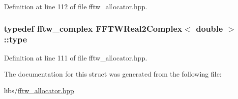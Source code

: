 Definition at line 112 of file fftw\-\_\-allocator.\-hpp.

\hypertarget{struct_f_f_t_w_real2_complex_3_01double_01_4_a1753289e8cc3cad75fe613d8fd3e6f50}{
\subsubsection[{type}]{\setlength{\rightskip}{0pt plus 5cm}typedef fftw\-\_\-complex {\bf F\-F\-T\-W\-Real2\-Complex}$<$ double $>$\-::{\bf type}}}\label{struct_f_f_t_w_real2_complex_3_01double_01_4_a1753289e8cc3cad75fe613d8fd3e6f50}


Definition at line 111 of file fftw\-\_\-allocator.\-hpp.



The documentation for this struct was generated from the following file\-:\begin{DoxyCompactItemize}
\item 
libs/\hyperlink{fftw__allocator_8hpp}{fftw\-\_\-allocator.\-hpp}\end{DoxyCompactItemize}
